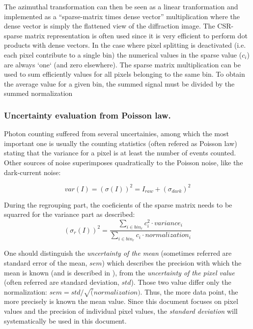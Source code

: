 \documentclass[preprint]{iucr}              %
\begin{document}
The azimuthal transformation can then be seen as a linear tranformation and implemented as a ``sparse-matrix times dense vector'' multiplication 
where the dense vector is simply the flattened view of the diffraction image\cite{pyFAI_gpu}. 
The CSR-sparse matrix representation is often used since it is very efficient to perform dot products with dense vectors.
In the case where pixel splitting is deactivated (i.e. each pixel contribute to a single bin) the numerical values in the sparse value ($c_i$) are always `one` (and zero elsewhere).
The sparse matrix multiplication can be used to sum efficiently values for all pixels belonging to the same bin.
To obtain the average value for a given bin, the summed signal must be divided by the summed normalization 
  
\subsubsection{Uncertainty evaluation from Poisson law.}
Photon counting suffered from several uncertainies, among which the most important one is usually the counting statistics (often refered as Poisson law)
stating that the variance for a pixel is at least the number of events counted.
Other sources of noise superimposes quadratically to the Poisson noise, like the dark-current noise:     

\begin{equation}
var(I) = (\sigma(I))^{2} = I_{raw} + (\sigma_{dark})^{2}  
\end{equation}

During the regrouping part, the coeficients of the sparse matrix needs to be squarred for the variance part as described: 
\begin{equation}
(\sigma_{r}(I))^2 = \frac{\sum\limits_{i \in bin_r} c_i^2 \cdot variance_i}
                  {\sum\limits_{i \in bin_r} c_i \cdot normalization_i} 
\end{equation}

One should distinguish the \textit{uncertainty of the mean} (sometimes referred are standard error of the mean, $sem$) 
which describes the precision with which the mean is known (and is described in \cite{pyfai_2020}),
from the \textit{uncertainty of the pixel value} (often referred are standard deviation, $std$). 
Those two value differ only the normalization: $sem = std/\sqrt(normalization)$.
Thus, the more data point, the more precisely is known the mean value.
Since this document focuses on pixel values and the precision of individual pixel values, the \textit{standard deviation} will systematically be used in this document.  
\end{document}
